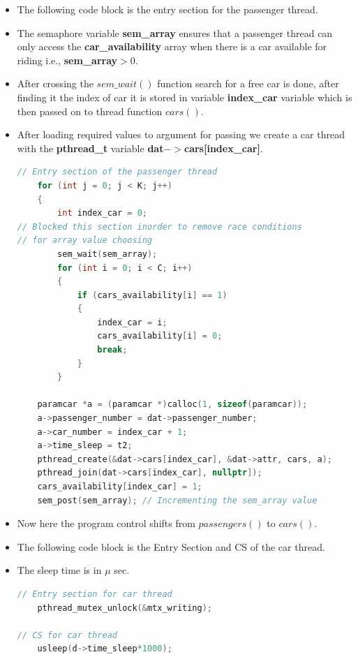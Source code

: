 \documentclass[12pt,a4paper]{article}
\begin{document}
\begin{itemize}
	\item The following code block is the entry section for the passenger thread.
\item The semaphore variable \textbf{sem\_array} ensures that a passenger thread can only access the \textbf{car\_availability} array when  there is a car available for riding i.e.,  \textbf{sem\_array}$>0$.
\item After crossing the $sem\_wait()$ function search for a free car is done, after finding it the index of car it is stored in variable \textbf{index\_car} variable which is then passed on to thread function $cars()$.
\item After loading required values to argument for passing we create a car thread with the \textbf{pthread\_t} variable \textbf{dat$->$cars[index\_car]}.
		\begin{lstlisting}[language=C++, style = mystyle]
// Entry section of the passenger thread
	for (int j = 0; j < K; j++)
	{
		int index_car = 0;
// Blocked this section inorder to remove race conditions
// for array value choosing
		sem_wait(sem_array); 
		for (int i = 0; i < C; i++)
		{
			if (cars_availability[i] == 1)
			{
				index_car = i;
				cars_availability[i] = 0;
				break;
			}
		}
	
	paramcar *a = (paramcar *)calloc(1, sizeof(paramcar));
	a->passenger_number = dat->passenger_number;
	a->car_number = index_car + 1;
	a->time_sleep = t2;
	pthread_create(&dat->cars[index_car], &dat->attr, cars, a);
	pthread_join(dat->cars[index_car], nullptr]);
	cars_availability[index_car] = 1;
	sem_post(sem_array); // Incrementing the sem_array value
\end{lstlisting}


	\item Now here the program control shifts from $passengers()$ to $cars()$.
	
	\item The following code block is the Entry Section and CS of the car thread.
	\item The sleep time is in $\mu$ sec.
			\begin{lstlisting}[language=C++, style = mystyle]
// Entry section for car thread
	pthread_mutex_unlock(&mtx_writing);

// CS for car thread
	usleep(d->time_sleep*1000);
		\end{lstlisting}
		

\end{itemize}
\end{document}
